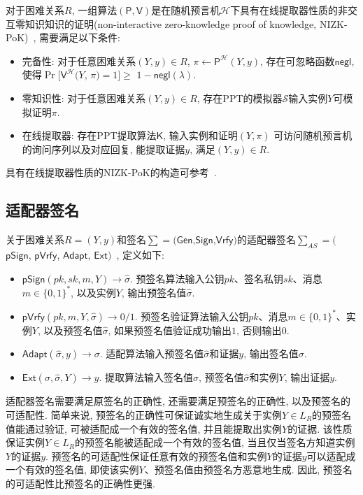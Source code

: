 \documentclass[review]{jcr}
\begin{document}
对于困难关系$R$, 一组算法$(\mathsf{P},\mathsf{V})$是在随机预言机$\mathcal{H}$下具有在线提取器性质的非交互零知识知识的证明(non-interactive zero-knowledge proof of knowledge, NIZK-PoK)~\cite{AumayrEEFHMMR20,Fischlin05}, 需要满足以下条件: 

\begin{itemize}
  \item 完备性: 对于任意困难关系$(Y,y)\in R$, $\pi\leftarrow \mathsf{P}^{\mathcal{H}}(Y,y)$, 存在可忽略函数$\mathsf{negl}$, 使得$\Pr[$$\mathsf{V}^{\mathcal{H}}$$(Y$, $\pi)$$=1]$$\geq$ $1-\mathsf{negl}(\lambda)$. 
  \item 零知识性: 对于任意困难关系$(Y,y)\in R$, 存在PPT的模拟器$\mathcal{S}$输入实例$Y$可模拟证明$\pi$.
  \item 在线提取器: 存在PPT提取算法$\mathsf{K}$, 输入实例和证明$(Y,\pi)$ 可访问随机预言机的询问序列以及对应回复, 能提取证据$y$, 满足$(Y,y)\in R$.  
\end{itemize}

具有在线提取器性质的NIZK-PoK的构造可参考~\cite{Fischlin05}.

\subsection{适配器签名}
关于困难关系$R=(Y,y)$和签名$\sum=(\mathsf{Gen}$,$\mathsf{Sign}$,$\mathsf{Vrfy})$的适配器签名$\sum_{AS}=($$\mathsf{pSign}$, $\mathsf{pVrfy}$, $\mathsf{Adapt}$, $\mathsf{Ext})$~\cite{AumayrEEFHMMR20}, 定义如下: 

\begin{itemize}
  \item $\mathsf{pSign}(pk,sk,m,Y)\rightarrow \hat{\sigma}$. 预签名算法输入公钥$pk$、签名私钥$sk$、消息$m\in\{0,1\}^*$, 以及实例$Y$, 输出预签名值$\hat{\sigma}$.

  \item $\mathsf{pVrfy}(pk,m,Y,\hat{\sigma})\rightarrow 0/1$. 预签名验证算法输入公钥$pk$、消息$m\in\{0,1\}^*$、实例$Y$, 以及预签名值$\hat{\sigma}$, 如果预签名值验证成功输出$1$, 否则输出$0$.

  \item $\mathsf{Adapt}(\hat{\sigma},y)\rightarrow \sigma$.
  适配算法输入预签名值$\hat{\sigma}$和证据$y$, 输出签名值$\sigma$.

  \item $\mathsf{Ext}(\sigma,\hat{\sigma},Y)\rightarrow y$.
  提取算法输入签名值$\sigma$, 预签名值$\hat{\sigma}$和实例$Y$, 输出证据$y$.
\end{itemize}

适配器签名需要满足原签名的正确性, 还需要满足预签名的正确性, 以及预签名的可适配性. 简单来说, 预签名的正确性可保证诚实地生成关于实例$Y\in L_R$的预签名值能通过验证, 可被适配成一个有效的签名值, 并且能提取出实例$Y$的证据. 该性质保证实例$Y\in L_R$的预签名能被适配成一个有效的签名值, 当且仅当签名方知道实例$Y$的证据$y$. 预签名的可适配性保证任意有效的预签名值和实例$Y$的证据$y$可以适配成一个有效的签名值, 即使该实例$Y$、预签名值由预签名方恶意地生成. 因此, 预签名的可适配性比预签名的正确性更强. 
\end{document}
